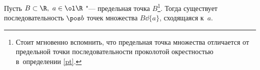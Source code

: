 
Пусть $B\subset\R,\ a\in\ol\R$ "--- предельная точка $B$\footnote{
Стоит мгновенно вспомнить, что предельная точка множества отличается от предельной точки последовательности проколотой окрестностью в~определении \ref{pt}.}. 
Тогда существует последовательность $\pos b$ точек множества $B\dd\{a\}$, сходящаяся к~$a$.
